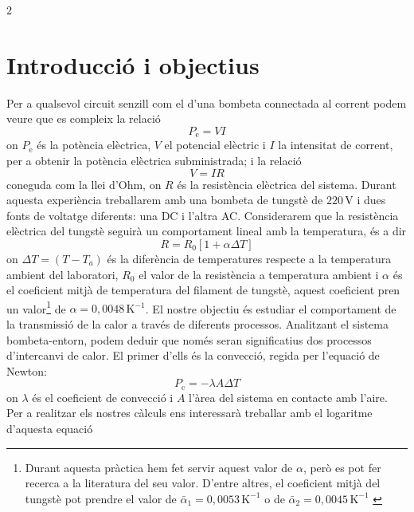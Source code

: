 \documentclass[12pt,twosides,onecolumn,openany]{article}
\begin{document}
\begin{multicols}{2}
\section{Introducció i objectius}
Per a qualsevol circuit senzill com el d'una bombeta connectada al corrent podem veure que es compleix la relació
\begin{equation}\label{Pot_elec}
  P_{\text{e}} = VI
\end{equation}
on $P_{\text{e}}$ és la potència elèctrica, $V$ el potencial elèctric i $I$ la intensitat de corrent, per a obtenir la potència elèctrica subministrada; i la relació
\begin{equation}\label{Llei_Ohm}
  V =IR
\end{equation}
coneguda com la llei d'Ohm, on $R$ és la resistència elèctrica del sistema. Durant aquesta experiència treballarem amb una bombeta de tungstè de \(220 \, \text{V}\) i dues fonts de voltatge diferents: una DC i l'altra AC. Considerarem que la resistència elèctrica del tungstè seguirà un comportament lineal amb la temperatura, és a dir
\begin{equation}\label{resistencia}
  R = R_0[1+\alpha\Delta T]
\end{equation}
on $\Delta T = (T - T_a)$ és la diferència de temperatures respecte a la temperatura ambient del laboratori, $R_0$ el valor de la resistència a temperatura ambient i $\alpha$ és el coeficient mitjà de temperatura del filament de tungstè, aquest coeficient pren un valor\footnote{Durant aquesta pràctica hem fet servir aquest valor de $\alpha$, però es pot fer recerca a la literatura del seu valor. D'entre altres, el coeficient mitjà del tungstè pot prendre el valor de \(\bar{\alpha}_1 = 0,0053\,\text{K}^{-1}\) \cite{llibre_lab} o de \( \bar{\alpha}_2 = 0,0045\, \text{K}^{-1}\) \cite{toolbox}} de \(\alpha = 0,0048 \, \text{K}^{-1}\).
El nostre objectiu és estudiar el comportament de la transmissió de la calor a través de diferents processos. Analitzant el sistema bombeta-entorn, podem deduir que només seran significatius dos processos d'intercanvi de calor. El primer d'ells és la convecció, regida per l'equació de Newton:
\begin{equation}\label{Newton}
  P_{\text{c}} = -\lambda A\Delta T
\end{equation}
on $\lambda$ és el coeficient de convecció i $A$ l'àrea del sistema en contacte amb l'aire. Per a realitzar els nostres càlculs ens interessarà treballar amb el logaritme d'aquesta equació
\begin{equation}\label{ln_Newton}

\end{equation}
\end{multicols}
\end{document}
